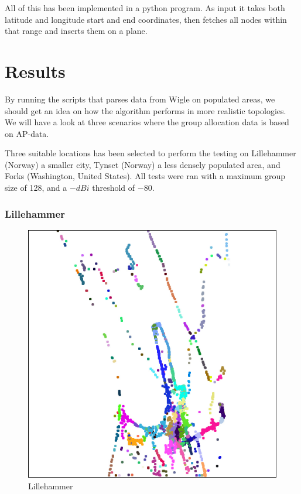 All of this has been implemented in a python program. As input it takes both latitude and longitude start and end coordinates,
    then fetches all nodes within that range and inserts them on a plane. 

    \section{Results}
    By running the scripts that parses data from Wigle on populated areas, we should get an idea 
    on how the algorithm performs in more realistic topologies. We will have a look at three
    scenarios where the group allocation data is based on AP-data. 

Three suitable locations has been selected to perform the testing on Lillehammer (Norway)
	a smaller city, Tynset (Norway) a less densely populated area, 
	and Forks (Washington, United States). All tests were 
	ran with a maximum group size of 128, and a $-dBi$ threshold of $-80$. 

	\subsubsection{Lillehammer}
	\begin{figure}
	\center
	\includegraphics[scale=0.46]{Images/cities/lillehammer_groups.jpg}
	\caption{Lillehammer}
	\label{fig:lillehammer_topo}
	\end{figure}

